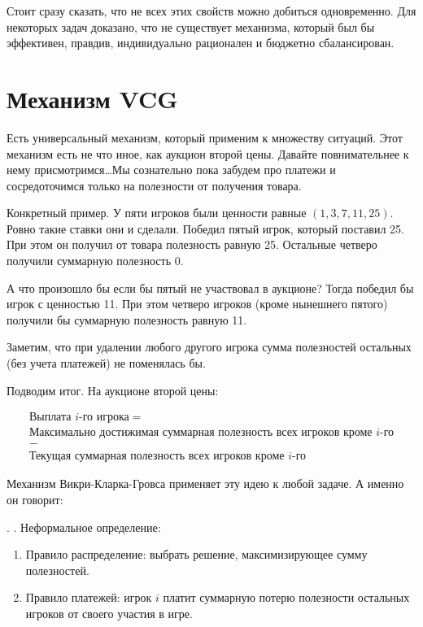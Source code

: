 Стоит сразу сказать, что не всех этих свойств можно добиться одновременно. Для некоторых задач доказано, что не существует механизма, который был бы эффективен, правдив, индивидуально рационален и бюджетно сбалансирован.


\section{Механизм VCG}

Есть универсальный механизм, который применим к множеству ситуаций. Этот механизм есть не что иное, как аукцион второй цены. Давайте повнимательнее к нему присмотримся\ldots Мы сознательно пока забудем про платежи и сосредоточимся только на полезности от получения товара.



Конкретный пример. У пяти игроков были ценности равные $ (1,3,7,11,25) $. Ровно такие ставки они и сделали. Победил пятый игрок, который поставил 25.  При этом он получил от товара полезность равную 25. Остальные четверо получили суммарную полезность 0. 

А что произошло бы если бы пятый не участвовал в аукционе? Тогда победил бы игрок с ценностью 11. При этом четверо игроков (кроме нынешнего пятого) получили бы суммарную полезность равную 11. 

Заметим, что при удалении любого другого игрока сумма полезностей остальных (без учета платежей) не поменялась бы.

Подводим итог. На аукционе второй цены:

\begin{multline}
\text{Выплата } i\text{-го игрока}=\\
\text{Максимально достижимая суммарная полезность всех игроков кроме }i\text{-го} \\
-\\
\text{Текущая суммарная полезность всех игроков кроме }i\text{-го}
\end{multline}

Механизм Викри-Кларка-Гровса применяет эту идею к любой задаче. А именно он говорит:

\begin{mydef}. . Неформальное определение:
\begin{enumerate}
\item Правило распределение: выбрать решение, максимизирующее сумму полезностей.
\item Правило платежей: игрок $ i $ платит суммарную потерю полезности остальных игроков от своего участия в игре.
\end{enumerate}
\end{mydef}

